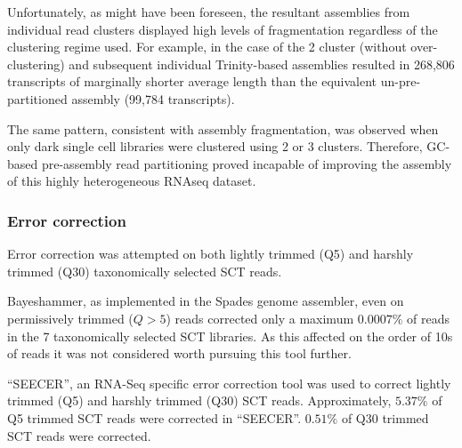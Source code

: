 Unfortunately, as might have been foreseen, the resultant assemblies from individual
read clusters displayed high levels of fragmentation regardless of the clustering
regime used.  For example, in the case of the 2 cluster (without over-clustering) 
and subsequent individual Trinity-based assemblies resulted in 268,806 transcripts
of marginally shorter average length than the equivalent un-pre-partitioned assembly
(99,784 transcripts).

The same pattern, consistent with assembly fragmentation, 
was observed when only dark single cell libraries were clustered using 
2 or 3 clusters. 
Therefore, GC-based pre-assembly read partitioning proved incapable of improving
the assembly of this highly heterogeneous RNAseq dataset.


\subsubsection{Error correction}

Error correction was attempted on both lightly trimmed (Q5) and harshly trimmed (Q30) 
taxonomically selected SCT reads.

Bayeshammer, as implemented in the Spades genome assembler, even on permissively trimmed
(\(Q>5\)) reads corrected only a maximum \(0.0007\%\) of reads in the 7 taxonomically selected SCT libraries.
As this affected on the order of 10s of reads it was not considered worth pursuing this tool further.

``SEECER'', an RNA-Seq specific error correction tool was used to correct 
lightly trimmed (Q5) and harshly trimmed (Q30) SCT reads.  
Approximately, \(5.37\%\) of Q5 trimmed SCT reads
were corrected in ``SEECER''. \(0.51\%\) of Q30 trimmed
SCT reads were corrected.  

